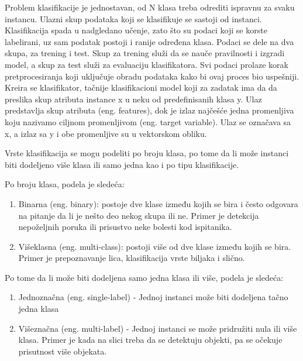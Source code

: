 \documentclass[12pt,oneside]{memoir}
\begin{document}
Problem klasifikacije je jednostavan, od N klasa treba odrediti ispravnu za svaku instancu. Ulazni skup podataka koji se klasifikuje se sastoji od instanci. Klasifikacija spada u nadgledano učenje, zato što su podaci koji se korste labelirani, uz sam podatak postoji i ranije određena klasa. Podaci se dele na dva skupa, za trening i test. Skup za trening služi da se nauče pravilnosti i izgradi model, a skup za test služi za evaluaciju klasifikatora. Svi podaci prolaze korak pretprocesiranja koji uključuje obradu podataka kako bi ovaj proces bio uspešniji. Kreira se klasifikator, tačnije klasifikacioni model koji za zadatak ima da da preslika skup atributa instance x u neku od predefinisanih klasa y. 
\newline\newline\newline
Ulaz predstavlja skup atributa (eng. features), dok je izlaz najčešće jedna promenljiva koju nazivamo ciljnom promenljivom (eng. target variable). Ulaz se označava sa x, a izlaz sa y i obe promenljive su u vektorskom obliku.

Vrste klasifikacija se mogu podeliti po broju klasa, po tome da li može instanci biti dodeljeno više klasa ili samo jedna kao i po tipu klasifikacije.

Po broju klasa, podela je sledeća:

\begin{enumerate}
\item Binarna (eng. binary): postoje dve klase između kojih se bira i često odgovara na pitanje da li je nešto deo nekog skupa ili ne. Primer je detekcija nepoželjnih poruka ili prisustvo neke bolesti kod ispitanika.
\item Višeklasna (eng. multi-class): postoji više od dve klase između kojih se bira. Primer je prepoznavanje lica, klasifikacija vrste biljaka i slično. 
\end{enumerate}

Po tome da li može biti dodeljena samo jedna klasa ili više, podela je sledeća:

\begin{enumerate}
\item Jednoznačna (eng. single-label) - Jednoj instanci može biti dodeljena tačno jedna klasa
\item Višeznačna (eng.  multi-label) - Jednoj instanci se može pridružiti nula ili više klasa. Primer je kada na slici treba da se detektuju objekti, pa se očekuje prisutnost više objekata.
\end{enumerate}
\end{document}
